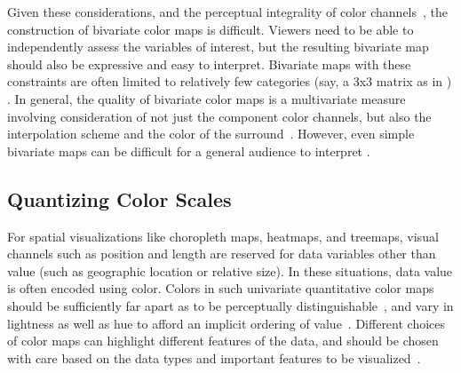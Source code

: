 
Given these considerations, and the perceptual integrality of color channels~\cite{garner1970integrality, ware2012information}, the construction of bivariate color maps is difficult. Viewers need to be able to independently assess the variables of interest, but the resulting bivariate map should also be expressive and easy to interpret. Bivariate maps with these constraints are often limited to relatively few categories (say, a 3x3 matrix as in ) \cite{robertson1986generation,trumbo1981theory}. In general, the quality of bivariate color maps is a multivariate measure involving consideration of not just the component color channels, but also the interpolation scheme and the color of the surround~\cite{bernard2015survey}. However, even simple bivariate maps can be difficult for a general audience to interpret \cite{wainer1980empirical}.

\subsection{Quantizing Color Scales}



For spatial visualizations like choropleth maps, heatmaps, and treemaps, visual channels such as position and length are reserved for data variables other than value (such as geographic location or relative size). In these situations, data value is often encoded using color. Colors in such univariate quantitative color maps should be sufficiently far apart as to be perceptually distinguishable~\cite{ware1988color}, and vary in lightness as well as hue to afford an implicit ordering of value~\cite{borland2007rainbow,rogowitz2001blair}. Different choices of color maps can highlight different features of the data, and should be chosen with care based on the data types and important features to be visualized~\cite{rogowitz1996not}.



